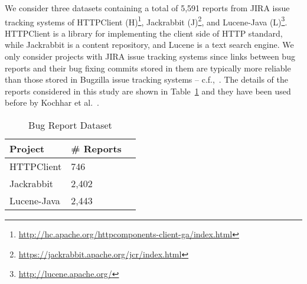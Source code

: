 We consider three datasets containing a total of 5,591 reports from JIRA issue tracking systems of HTTPClient (H)\footnote{\url{http://hc.apache.org/httpcomponents-client-ga/index.html}}, Jackrabbit (J)\footnote{\url{https://jackrabbit.apache.org/jcr/index.html}}, and Lucene-Java (L)\footnote{\url{ http://lucene.apache.org/}}. HTTPClient is a library for implementing the client side of HTTP standard, while Jackrabbit is a content repository, and Lucene is a text search engine. We only consider projects with JIRA issue tracking systems since links between bug reports and their bug fixing commits stored in them are typically more reliable than those stored in Bugzilla issue tracking systems -- c.f.,~\cite{BissyandeTWLJR13}. The details of the reports considered in this study are shown in Table~\ref{tab:reports} and they have been used before by Kochhar et al.~\cite{KochharTL14}. 

\begin{table}
\caption{Bug Report Dataset}\label{tab:reports}
\begin{tabular}{|l|l|l}
\hline
{\bf Project} & {\bf \# Reports} \\
\hline HTTPClient & 746\\
\hline Jackrabbit & 2,402\\
\hline Lucene-Java & 2,443\\
\hline
\end{tabular}
\end{table}




